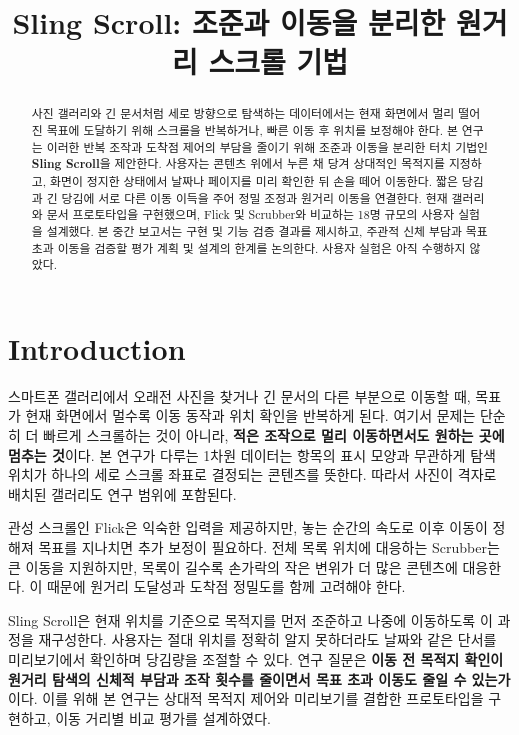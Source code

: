 \documentclass[manuscript,review,nonacm]{acmart}
\title{Sling Scroll: 조준과 이동을 분리한 원거리 스크롤 기법}
\author{}
\begin{document}
\begin{abstract}
사진 갤러리와 긴 문서처럼 세로 방향으로 탐색하는 데이터에서는 현재 화면에서 멀리 떨어진 목표에 도달하기 위해 스크롤을 반복하거나, 빠른 이동 후 위치를 보정해야 한다. 본 연구는 이러한 반복 조작과 도착점 제어의 부담을 줄이기 위해 조준과 이동을 분리한 터치 기법인 \textbf{Sling Scroll}을 제안한다. 사용자는 콘텐츠 위에서 누른 채 당겨 상대적인 목적지를 지정하고, 화면이 정지한 상태에서 날짜나 페이지를 미리 확인한 뒤 손을 떼어 이동한다. 짧은 당김과 긴 당김에 서로 다른 이동 이득을 주어 정밀 조정과 원거리 이동을 연결한다. 현재 갤러리와 문서 프로토타입을 구현했으며, Flick 및 Scrubber와 비교하는 18명 규모의 사용자 실험을 설계했다. 본 중간 보고서는 구현 및 기능 검증 결과를 제시하고, 주관적 신체 부담과 목표 초과 이동을 검증할 평가 계획 및 설계의 한계를 논의한다. 사용자 실험은 아직 수행하지 않았다.
\end{abstract}
\maketitle

\section{Introduction}

스마트폰 갤러리에서 오래전 사진을 찾거나 긴 문서의 다른 부분으로 이동할 때, 목표가 현재 화면에서 멀수록 이동 동작과 위치 확인을 반복하게 된다. 여기서 문제는 단순히 더 빠르게 스크롤하는 것이 아니라, \textbf{적은 조작으로 멀리 이동하면서도 원하는 곳에 멈추는 것}이다. 본 연구가 다루는 1차원 데이터는 항목의 표시 모양과 무관하게 탐색 위치가 하나의 세로 스크롤 좌표로 결정되는 콘텐츠를 뜻한다. 따라서 사진이 격자로 배치된 갤러리도 연구 범위에 포함된다.

관성 스크롤인 Flick은 익숙한 입력을 제공하지만, 놓는 순간의 속도로 이후 이동이 정해져 목표를 지나치면 추가 보정이 필요하다. 전체 목록 위치에 대응하는 Scrubber는 큰 이동을 지원하지만, 목록이 길수록 손가락의 작은 변위가 더 많은 콘텐츠에 대응한다. 이 때문에 원거리 도달성과 도착점 정밀도를 함께 고려해야 한다.

Sling Scroll은 현재 위치를 기준으로 목적지를 먼저 조준하고 나중에 이동하도록 이 과정을 재구성한다. 사용자는 절대 위치를 정확히 알지 못하더라도 날짜와 같은 단서를 미리보기에서 확인하며 당김량을 조절할 수 있다. 연구 질문은 \textbf{이동 전 목적지 확인이 원거리 탐색의 신체적 부담과 조작 횟수를 줄이면서 목표 초과 이동도 줄일 수 있는가}이다. 이를 위해 본 연구는 상대적 목적지 제어와 미리보기를 결합한 프로토타입을 구현하고, 이동 거리별 비교 평가를 설계하였다.
\end{document}
